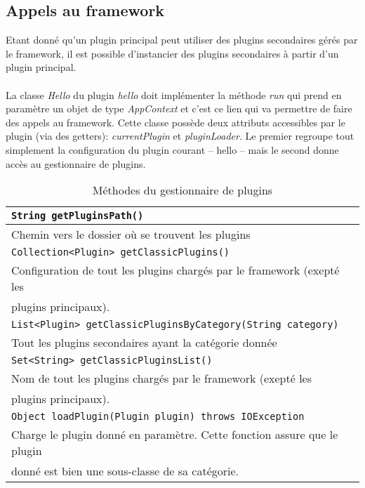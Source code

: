\documentclass[12pt,a4paper]{article}
\begin{document}
\subsection{Appels au framework}
Etant donné qu'un plugin principal peut utiliser des plugins secondaires gérés 
par le framework, il est possible d'instancier des plugins secondaires à 
partir d'un plugin principal.
\\\\
La classe \emph{Hello} du plugin \emph{hello} doit implémenter la méthode 
\emph{run} qui prend en paramètre un objet de type \emph{AppContext} et c'est 
ce lien qui va permettre de faire des appels au framework. 
Cette classe possède deux attributs accessibles par le plugin (via des getters):
\emph{currentPlugin} et \emph{pluginLoader}. Le premier regroupe tout simplement 
la configuration du plugin courant -- hello -- mais le second donne accès au 
gestionnaire de plugins.

\begin{table}[h]
	\begin{tabular}{|l|}
		\hline
		\texttt{String getPluginsPath()}\\
		\hline
		Chemin vers le dossier où se trouvent les plugins\\
		\hline			

		\hline
		\texttt{Collection<Plugin> getClassicPlugins()}\\
		\hline
		Configuration de tout les plugins chargés par le framework (exepté les\\ 
		plugins	principaux).\\
		\hline
	
		\hline
		\texttt{List<Plugin> getClassicPluginsByCategory(String category)}\\
		\hline
		Tout les plugins secondaires ayant la catégorie donnée\\
		\hline

		\hline
		\texttt{Set<String> getClassicPluginsList()}\\
		\hline
		Nom de tout les plugins chargés par le framework (exepté les \\
		plugins	principaux).\\
		\hline
			
		\hline
		\texttt{Object loadPlugin(Plugin plugin) throws IOException}\\
		\hline
		Charge le plugin donné en paramètre. Cette fonction assure que le plugin\\
		donné est bien une sous-classe de sa catégorie.\\
		\hline
	\end{tabular}	
\caption{Méthodes du gestionnaire de plugins}
\end{table}
\end{document}
